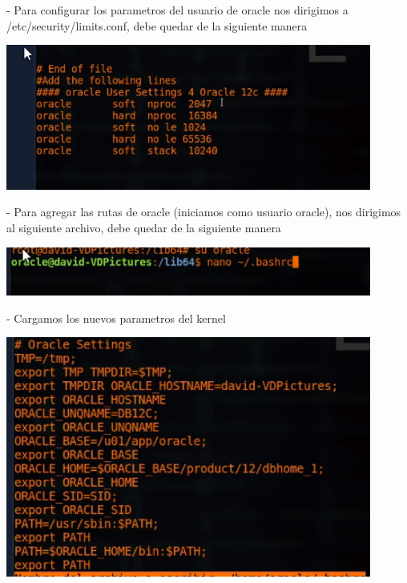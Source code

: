 \documentclass[12pt,letterpaper]{article}
\begin{document}
\begin{itemize}
- Para configurar los parametros del usuario de oracle nos dirigimos a /etc/security/limits.conf, debe quedar de la siguiente manera\\
\end{itemize}

\begin{center}
	\includegraphics[width=12cm]{./Imagenes/38} 
\end{center}


\begin{itemize}
- Para agregar las rutas de oracle (iniciamos como usuario oracle), nos dirigimos al siguiente archivo, debe quedar de la siguiente manera\\
\end{itemize}

\begin{center}
	\includegraphics[width=12cm]{./Imagenes/39} 
\end{center}



\begin{itemize}
- Cargamos los nuevos parametros del kernel\\
\end{itemize}

\begin{center}
	\includegraphics[width=12cm]{./Imagenes/40} 
\end{center}
\end{document}
